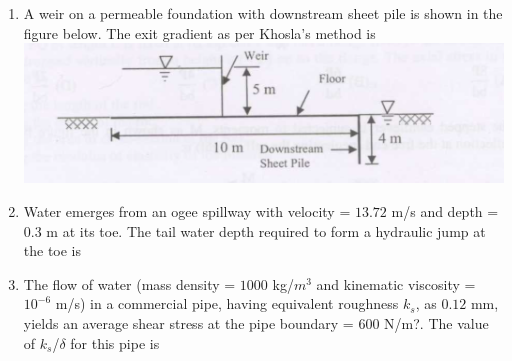 \documentclass[journal]{IEEEtran}
\begin{document}
\begin{enumerate}
\item A weir on a permeable foundation with downstream sheet pile is shown in the figure below. The exit gradient as per Khosla's method is \hfill {}
\includegraphics[width=0.6\columnwidth]{figs/fig4.png} 
\begin{enumerate}
\end{enumerate}

\item Water emerges from an ogee spillway with velocity = $13.72$ m/s and depth = $0.3$ m at its toe. The tail water depth required to form a hydraulic jump at the toe is \hfill {}

\begin{enumerate}
\end{enumerate}

\item The flow of water (mass density = $1000$ kg/$m^{3}$ and kinematic viscosity = $10^{-6}$ m/s) in a commercial pipe, having equivalent roughness $k_s$, as $0.12$ mm, yields an average shear stress at the pipe boundary = $600$ N/m?. The value of $k_s$/$\delta$  for this pipe is \hfill {}

\begin{enumerate}
\end{enumerate}


\end{enumerate}
\end{document}
